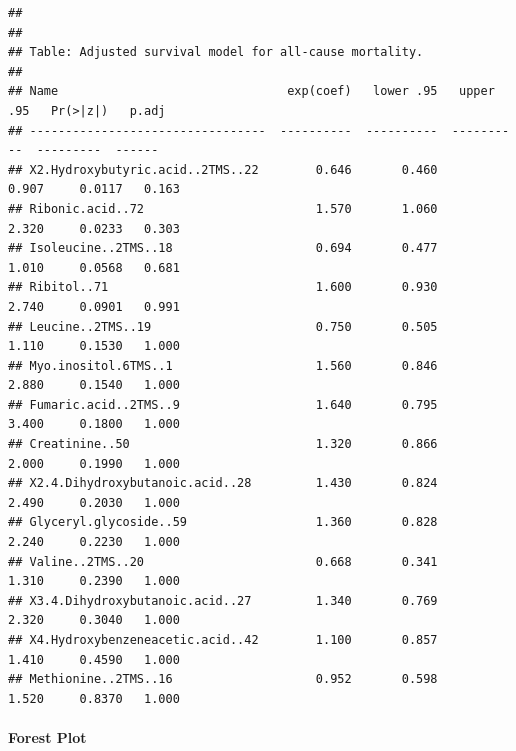 \documentclass[]{article}
\let\oldparagraph\paragraph
\renewcommand{\paragraph}[1]{\oldparagraph{#1}\mbox{}}
\begin{document}
\begin{verbatim}
## 
## 
## Table: Adjusted survival model for all-cause mortality.
## 
## Name                                exp(coef)   lower .95   upper .95   Pr(>|z|)   p.adj
## ---------------------------------  ----------  ----------  ----------  ---------  ------
## X2.Hydroxybutyric.acid..2TMS..22        0.646       0.460       0.907     0.0117   0.163
## Ribonic.acid..72                        1.570       1.060       2.320     0.0233   0.303
## Isoleucine..2TMS..18                    0.694       0.477       1.010     0.0568   0.681
## Ribitol..71                             1.600       0.930       2.740     0.0901   0.991
## Leucine..2TMS..19                       0.750       0.505       1.110     0.1530   1.000
## Myo.inositol.6TMS..1                    1.560       0.846       2.880     0.1540   1.000
## Fumaric.acid..2TMS..9                   1.640       0.795       3.400     0.1800   1.000
## Creatinine..50                          1.320       0.866       2.000     0.1990   1.000
## X2.4.Dihydroxybutanoic.acid..28         1.430       0.824       2.490     0.2030   1.000
## Glyceryl.glycoside..59                  1.360       0.828       2.240     0.2230   1.000
## Valine..2TMS..20                        0.668       0.341       1.310     0.2390   1.000
## X3.4.Dihydroxybutanoic.acid..27         1.340       0.769       2.320     0.3040   1.000
## X4.Hydroxybenzeneacetic.acid..42        1.100       0.857       1.410     0.4590   1.000
## Methionine..2TMS..16                    0.952       0.598       1.520     0.8370   1.000
\end{verbatim}

\newpage

\hypertarget{forest-plot-3}{%
\paragraph{Forest Plot}\label{forest-plot-3}}
\end{document}
